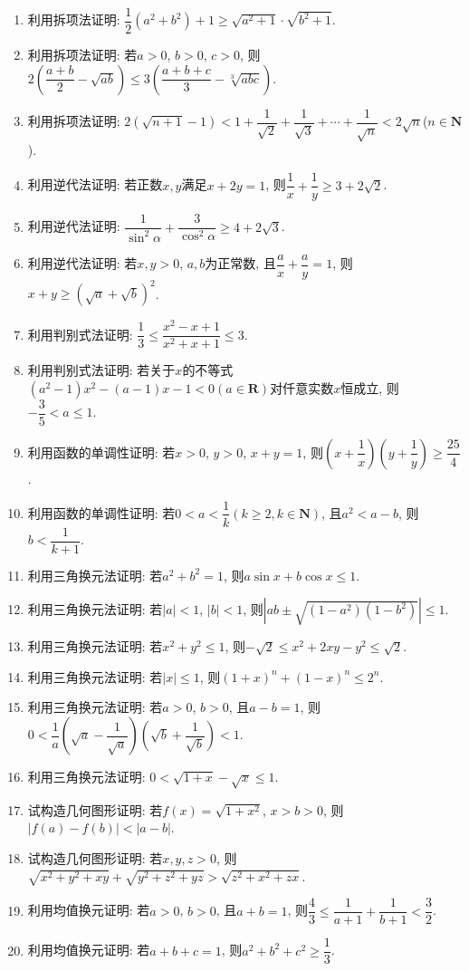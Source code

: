 \documentclass[10pt,a4paper]{article}
\begin{document}
\begin{enumerate}[1.]
\item 利用拆项法证明: $\dfrac 12({a^2}+{b^2})+1\ge \sqrt{{a^2}+1}\cdot \sqrt{{b^2}+1}$.
\item 利用拆项法证明: 若$a>0$, $b>0$, $c>0$, 则$2(\dfrac{a+b}2-\sqrt{ab})\le 3(\dfrac{a+b+c}3-\sqrt[3]{abc})$.
\item 利用拆项法证明: $2(\sqrt{n+1}-1)<1+\dfrac 1{\sqrt 2}+\dfrac 1{\sqrt 3}+\cdots +\dfrac 1{\sqrt n}<2\sqrt n$($n\in \mathbf{N}$).
\item 利用逆代法证明: 若正数$x,y$满足$x+2y=1$, 则$\dfrac 1x+\dfrac 1y\ge 3+2\sqrt 2$.
\item 利用逆代法证明: $\dfrac 1{\sin ^2\alpha}+\dfrac 3{\cos^2\alpha}\ge 4+2\sqrt 3$.
\item 利用逆代法证明: 若$x,y>0$, $a,b$为正常数, 且$\dfrac ax+\dfrac ay=1$, 则$x+y\ge (\sqrt a+\sqrt b)^2$.
\item 利用判别式法证明: $\dfrac 13\le \dfrac{x^2-x+1}{x^2+x+1}\le 3$.
\item 利用判别式法证明: 若关于$x$的不等式$(a^2-1)x^2-(a-1)x-1<0(a\in \mathbf{R})$对仟意实数$x$恒成立, 则$-\dfrac 35<a\le 1$.
\item 利用函数的单调性证明: 若$x>0$, $y>0$, $x+y=1$, 则$(x+\dfrac 1x)(y+\dfrac 1y)\ge \dfrac{25}4$.
\item 利用函数的单调性证明: 若$0<a<\dfrac 1k(k\ge 2,k\in \mathbf{N})$, 且$a^2<a-b$, 则$b<\dfrac 1{k+1}$.
\item 利用三角换元法证明: 若$a^2+b^2=1$, 则$a\sin x+b\cos x\le 1$.
\item 利用三角换元法证明: 若$|a|<1$, $|b|<1$, 则$|ab\pm \sqrt{(1-{a^2})(1-{b^2})}|\le 1$.
\item 利用三角换元法证明: 若$x^2+y^2\le 1$, 则$-\sqrt 2\le x^2+2xy-y^2\le \sqrt 2$.
\item 利用三角换元法证明: 若$|x|\le 1$, 则$(1+x)^n+(1-x)^n\le 2^n$.
\item 利用三角换元法证明: 若$a>0$, $b>0$, 且$a-b=1$, 则$0<\dfrac 1a(\sqrt a-\dfrac 1{\sqrt a})(\sqrt b+\dfrac 1{\sqrt b})<1$.
\item 利用三角换元法证明: $0<\sqrt{1+x}-\sqrt x\le 1$.
\item 试构造几何图形证明: 若$f(x)=\sqrt{1+x^2}$, $x>b>0$, 则$|f(a)-f(b)|<|a-b|$.
\item 试构造几何图形证明: 若$x,y,z>0$, 则$\sqrt{x^2+y^2+xy}+\sqrt{y^2+z^2+yz}>\sqrt{z^2+x^2+zx}$.
\item 利用均值换元证明: 若$a>0$, $b>0$, 且$a+b=1$, 则$\dfrac 43\le \dfrac 1{a+1}+\dfrac 1{b+1}<\dfrac 32$.
\item 利用均值换元证明: 若$a+b+c=1$, 则${a^2}+{b^2}+{c^2}\ge \dfrac 13$.

\end{enumerate}
\end{document}
